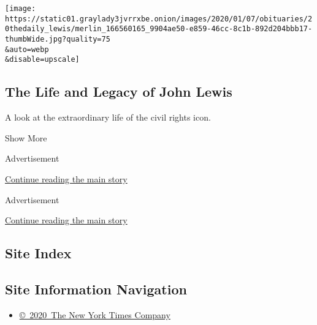 \begin{enumerate}
  \texttt{[image: https://static01.graylady3jvrrxbe.onion/images/2020/01/07/obituaries/20thedaily\_lewis/merlin\_166560165\_9904ae50-e859-46cc-8c1b-892d204bbb17-thumbWide.jpg?quality=75\\\&auto=webp\\\&disable=upscale]}

  \hypertarget{the-life-and-legacy-of-john-lewis}{%
  \subsection{The Life and Legacy of John
  Lewis}\label{the-life-and-legacy-of-john-lewis}}

  A look at the extraordinary life of the civil rights icon.
\end{enumerate}

Show More

Advertisement

\protect\hyperlink{after-mid5}{Continue reading the main story}

Advertisement

\protect\hyperlink{after-mktg}{Continue reading the main story}

\hypertarget{site-index}{%
\subsection{Site Index}\label{site-index}}

\hypertarget{site-information-navigation}{%
\subsection{Site Information
Navigation}\label{site-information-navigation}}

\begin{itemize}
\tightlist
\item
  \href{https://help.nytimes3xbfgragh.onion/hc/en-us/articles/115014792127-Copyright-notice}{©~2020~The
  New York Times Company}
\end{itemize}

